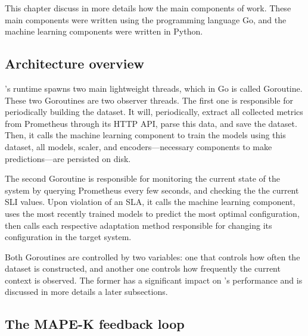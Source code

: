 This chapter discuss in more details how the main components of \projectname{} work. These main components were written using the programming language Go, and the machine learning components were written in Python.

\subsection{Architecture overview}

\projectname{}'s runtime spawns two main lightweight threads, which in Go is called Goroutine. These two Goroutines are two observer threads. The first one is responsible for periodically building the dataset. It will, periodically, extract all collected metrics from Prometheus through its HTTP API, parse this data, and save the dataset. Then, it calls the machine learning component to train the models using this dataset, all models, scaler, and encoders---necessary components to make predictions---are persisted on disk.

The second Goroutine is responsible for monitoring the current state of the system by querying Prometheus every few seconds, and checking the the current SLI values. Upon violation of an SLA, it calls the machine learning component, uses the most recently trained models to predict the most optimal configuration, then calls each respective adaptation method responsible for changing its configuration in the target system.

Both Goroutines are controlled by two variables: one that controls how often the dataset is constructed, and another one controls how frequently the current context is observed. The former has a significant impact on \projectname{}'s performance and is discussed in more details a later subsections.

\subsection{The MAPE-K feedback loop}

